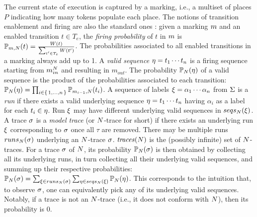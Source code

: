 The current state of execution is captured by a marking, i.e., a multiset of places $P$ indicating how many tokens populate each place.
The notions of transition enablement and firing are also the standard ones  \cite{MarsanCB84}: %
%
given a marking $\marking$ %
and an enabled transition $t \in T_e$, the \emph{firing probability} of $t$ in $\marking$ is $\probt{t}{\marking}{\net} = \frac{W(t)}{\sum_{t'\in T_e}W(t')}$. %
The probabilities associated to all enabled transitions in a marking always add up to 1.
 A \emph{valid sequence} $\seq = t_1\cdots t_n$ is a firing sequence starting from $m_{in}^\net$ and resulting in $m_{out}$. The probability $\prob{\seq}{\net}$ of a valid sequence is the product of the probabilities associated to each transition: $\prob{\seq}{\net} = \prod_{i \in \set{1,\ldots,n}}\prob{t_i}{\marking_{i-1},\net}$.  A sequence of labels $\run = \alpha_1 \cdots \alpha_n$ from $\alphabet$ is a \emph{run} if there exists a valid underlying sequence $\seq = t_1\cdots t_n$  having $\alpha_i$ as a label for each $t_i\in \seq$. Run $\run$ may have different underlying valid sequences in $\seqs{\run}{\net}$. A trace $\trace$ is a \emph{model trace} (or $\net$-trace for short) if there exists an underlying run $\run$ corresponding to $\trace$ once all $\tau$ are removed. There may be multiple runs $\runs{\trace}{\net}$ underlying an $\net$-trace $\trace$.  $\traces{\net}$ is the (possibly infinite) set of $\net$-traces. For a trace $\trace$ of $\net$, its probability $\prob{\trace}{\net}$ is then obtained by collecting all its underlying runs, in turn collecting all their underlying valid sequences, and summing up their respective probabilities: $\prob{\trace}{\net} = \sum_{\run \in \runs{\trace}{\net}} \sum_{\seq \in \seqs{\run}{\net}} \prob{\seq}{\net}$. This corresponds to the intuition that, to observe $\trace$, one can equivalently pick any of its underlying valid sequences. Notably, if a trace is not an $\net$-trace (i.e., it does not conform with $\net$), then its probability is 0.
